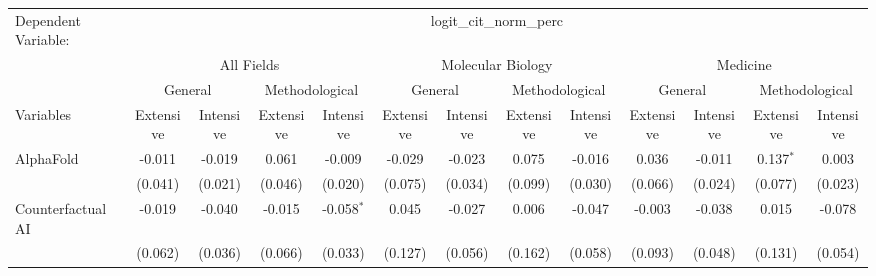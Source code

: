 \begingroup
\centering
\begin{tabular}{lcccccccccccc}
   \tabularnewline \midrule \midrule
   Dependent Variable: & \multicolumn{12}{c}{logit\_cit\_norm\_perc}\\
 & \multicolumn{4}{c}{All Fields} & \multicolumn{4}{c}{Molecular Biology} & \multicolumn{4}{c}{Medicine} \\
\cmidrule(lr){2-5} \cmidrule(lr){6-9} \cmidrule(lr){10-13}
 & \multicolumn{2}{c}{General} & \multicolumn{2}{c}{Methodological} & \multicolumn{2}{c}{General} & \multicolumn{2}{c}{Methodological} & \multicolumn{2}{c}{General} & \multicolumn{2}{c}{Methodological} \\
\cmidrule(lr){2-3} \cmidrule(lr){4-5} \cmidrule(lr){6-7} \cmidrule(lr){8-9} \cmidrule(lr){10-11} \cmidrule(lr){12-13}
Variables & \multicolumn{1}{c}{Extensive} & \multicolumn{1}{c}{Intensive} & \multicolumn{1}{c}{Extensive} & \multicolumn{1}{c}{Intensive} & \multicolumn{1}{c}{Extensive} & \multicolumn{1}{c}{Intensive} & \multicolumn{1}{c}{Extensive} & \multicolumn{1}{c}{Intensive} & \multicolumn{1}{c}{Extensive} & \multicolumn{1}{c}{Intensive} & \multicolumn{1}{c}{Extensive} & \multicolumn{1}{c}{Intensive} \\
\cmidrule(lr){1-1}\cmidrule(lr){2-2} \cmidrule(lr){3-3} \cmidrule(lr){4-4} \cmidrule(lr){5-5} \cmidrule(lr){6-6} \cmidrule(lr){7-7} \cmidrule(lr){8-8} \cmidrule(lr){9-9} \cmidrule(lr){10-10} \cmidrule(lr){11-11} \cmidrule(lr){12-12} \cmidrule(lr){13-13}
   AlphaFold                                & -0.011         & -0.019       & 0.061          & -0.009       & -0.029         & -0.023        & 0.075          & -0.016         & 0.036         & -0.011        & 0.137$^{*}$  & 0.003\\   
                                            & (0.041)        & (0.021)      & (0.046)        & (0.020)      & (0.075)        & (0.034)       & (0.099)        & (0.030)        & (0.066)       & (0.024)       & (0.077)      & (0.023)\\   
   Counterfactual AI                        & -0.019         & -0.040       & -0.015         & -0.058$^{*}$ & 0.045          & -0.027        & 0.006          & -0.047         & -0.003        & -0.038        & 0.015        & -0.078\\   
                                            & (0.062)        & (0.036)      & (0.066)        & (0.033)      & (0.127)        & (0.056)       & (0.162)        & (0.058)        & (0.093)       & (0.048)       & (0.131)      & (0.054)\\   

\end{tabular}
